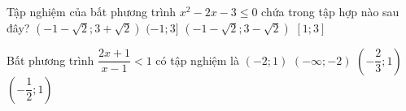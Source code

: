 \begin{ex}%
	Tập nghiệm của bất phương trình $x^2 - 2x- 3 \leq 0$ chứa trong tập hợp nào sau đây?
	\choice
	{\True $(-1-\sqrt{2}; 3 + \sqrt{2})$}
	{$(-1; 3]$}
	{$(-1-\sqrt{2}; 3 - \sqrt{2})$}
	{$[1;3]$}
\end{ex}
\begin{ex}%
	Bất phương trình $\dfrac{2x+1}{x-1}<1$ có tập nghiệm là
	\choice
	{\True $(-2;1)$}
	{$(-\infty;-2)$}
	{$\left(-\dfrac{2}{3};1\right)$}
	{$\left(-\dfrac{1}{2};1\right)$}
\end{ex}
